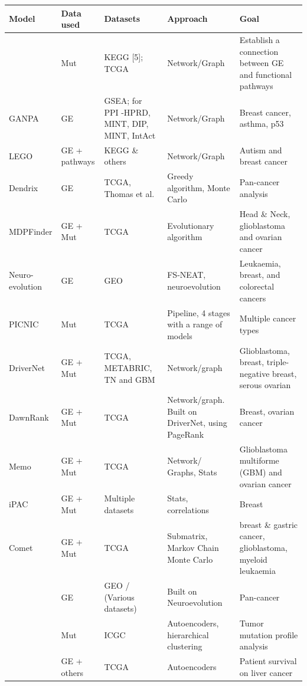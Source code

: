     
{\small %
\begin{longtable}{|p{3cm}|p{1.8cm}|p{2.2cm}|p{2.8cm}|p{3.5cm}|}
\hline 
\textbf{Model} & \textbf{Data used} & \textbf{Datasets} & \textbf{Approach} & \textbf{Goal} \\ 
\hline 
\endfirsthead

\endlastfoot    
\citet{Cava2018-rv} & Mut & KEGG [5]; TCGA  & Network/Graph & Establish a connection between GE and functional pathways  \\ \hline
GANPA & GE  & GSEA; for PPI -HPRD, MINT, DIP, MINT, IntAct & Network/Graph & Breast cancer, asthma, p53 \\ \hline
LEGO & GE + pathways & KEGG \& others & Network/Graph & Autism and breast cancer \\ \hline
Dendrix & GE & TCGA, Thomas et al. & Greedy algorithm, Monte Carlo & Pan-cancer analysis \\ \hline
MDPFinder & GE + Mut & TCGA & Evolutionary algorithm & Head \& Neck, glioblastoma and ovarian cancer \\ \hline
Neuro-evolution & GE & GEO & FS-NEAT, neuroevolution & Leukaemia, breast, and colorectal cancers \\ \hline
PICNIC  & Mut & TCGA  & Pipeline, 4 stages with a range of models & Multiple cancer types  \\ \hline
DriverNet & GE + Mut & TCGA, METABRIC, TN and GBM & Network/graph &  Glioblastoma, breast, triple-negative breast, serous ovarian \\ \hline
DawnRank & GE + Mut & TCGA & Network/graph. Built on DriverNet, using PageRank & Breast, ovarian cancer \\ \hline
Memo & GE + Mut & TCGA & Network/ Graphs, Stats & Glioblastoma multiforme (GBM) and ovarian cancer \\ \hline
iPAC & GE + Mut & Multiple datasets & Stats, correlations & Breast \\ \hline
Comet  & GE + Mut & TCGA & Submatrix, Markov Chain Monte Carlo & breast \& gastric cancer, glioblastoma, myeloid leukaemia \\ \hline
\citet{Feltes2019-bd} & GE  & GEO / (Various datasets) & Built on Neuroevolution & Pan-cancer \\ \hline
\citet{Palazzo2019-hx} & Mut & ICGC & Autoencoders, hierarchical clustering & Tumor mutation profile analysis \\ \hline
\citet{Chaudhary2018-qj} & GE + others & TCGA & Autoencoders & Patient survival on liver cancer \\ \hline

\end{longtable}}
